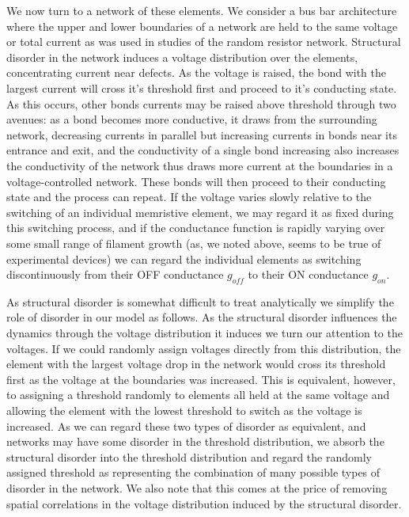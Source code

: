 \documentclass[aps,prl,preprint,groupedaddress]{revtex4-1}
\begin{document}
We now turn to a network of these elements.  We consider a bus bar
architecture
where the upper and lower boundaries of a network are held to the same
voltage or total current as was used in studies of the random resistor network.
Structural disorder in the
network induces a voltage distribution over the elements, concentrating
current near defects. As the voltage is raised, the bond with the largest
current will cross it's threshold first and proceed to it's conducting state.
As this occurs, other bonds currents may be raised above threshold through
two avenues: as a bond becomes more conductive, it draws from the surrounding
network, decreasing currents in parallel but increasing currents in bonds near
its entrance and exit, and the conductivity of a single bond increasing also
increases the conductivity of the network thus draws more current at the
boundaries in a voltage-controlled network. These bonds will then proceed to
their conducting state and the process can repeat.  If the voltage varies
slowly relative to the switching of an individual memristive element, we may
regard it as fixed during this switching process, and if the conductance
function is rapidly varying over some small range of filament growth (as,
we noted above, seems to be true of experimental devices) we can regard the
individual elements as switching discontinuously from their OFF conductance
$g_{off}$ to their ON conductance $g_{on}$.

As structural disorder is somewhat difficult to treat analytically we simplify
the role of disorder in our model as follows.  As the structural disorder
influences the dynamics through the voltage distribution it induces we turn
our attention to the voltages.  If we could randomly assign voltages directly
from this distribution, the element with the largest voltage drop in the
network would cross its threshold first as the voltage at the boundaries was
increased.  This is equivalent, however, to
assigning a threshold randomly to elements all held at the same voltage and
allowing the element with the lowest threshold to switch as the voltage is
increased.  As we can regard these two types of disorder as equivalent, and
networks may have some disorder in the threshold distribution, we absorb
the structural disorder into the threshold distribution and regard the
randomly assigned threshold as representing the combination of many possible
types of disorder in the network.  We also note that this comes at the price
of removing spatial correlations in the voltage distribution induced by the
structural disorder.
\end{document}
